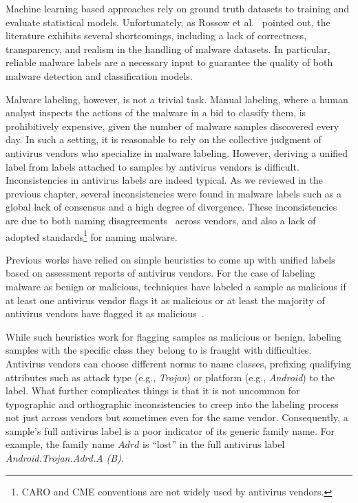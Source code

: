 \localtableofcontents{}

Machine learning based approaches rely on ground truth datasets to training and evaluate statistical models.
Unfortunately, as Rossow et al.~\cite{rossow_prudent_2012} pointed out, the literature exhibits several shortcomings, including a lack of correctness, transparency, and realism in the handling of malware datasets.
In particular, reliable malware labels are a necessary input to guarantee the quality of both malware detection and classification models.

Malware labeling, however, is not a trivial task.
Manual labeling, where a human analyst inspects the actions of the malware in a bid to classify them, is prohibitively expensive, given the number of malware samples discovered every day.
In such a setting, it is reasonable to rely on the collective judgment of antivirus vendors who specialize in malware labeling.
However, deriving a unified label from labels attached to samples by antivirus vendors is difficult.
Inconsistencies in antivirus labels are indeed typical.
As we reviewed in the previous chapter, several inconsistencies were found in malware labels such as a global lack of consensus and a high degree of divergence.
These inconsistencies are due to both naming disagreements~\cite{kantchelian_better_2015} across vendors, and also a lack of adopted standards\footnote{CARO and CME conventions are not widely used by antivirus vendors.} for naming malware.

Previous works have relied on simple heuristics to come up with unified labels based on assessment reports of antivirus vendors.
For the case of labeling malware as benign or malicious, techniques have labeled a sample as malicious if at least one antivirus vendor flags it as malicious or at least the majority of antivirus vendors have flagged it as malicious~\cite{arp_drebin:_2014, lindorfer_marvin:_2015}.

While such heuristics work for flagging samples as malicious or benign, labeling samples with the specific class they belong to is fraught with difficulties.
Antivirus vendors can choose different norms to name classes, prefixing qualifying attributes such as attack type (e.g., \emph{Trojan}) or platform (e.g., \emph{Android}) to the label.
What further complicates things is that it is not uncommon for typographic and orthographic inconsistencies to creep into the labeling process not just across vendors but sometimes even for the same vendor.
Consequently, a sample's full antivirus label is a poor indicator of its generic family name.
For example, the family name $Adrd$ is ``lost'' in the full antivirus label \textit{Android.Trojan.Adrd.A (B)}.

